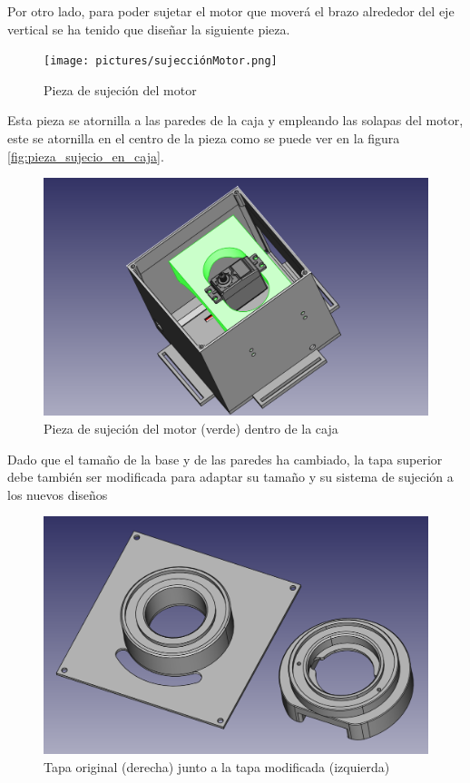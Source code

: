 Por otro lado, para poder sujetar el motor que moverá el brazo alrededor del eje vertical se ha tenido que diseñar la siguiente pieza.

 \begin{figure}[H]
    \centering
    \texttt{[image: pictures/sujecciónMotor.png]}
    \caption{Pieza de sujeción del motor}
    \label{fig:sujecion_motor}
\end{figure}

Esta pieza se atornilla a las paredes de la caja y empleando las solapas del motor, este se atornilla en el centro de la pieza como se puede ver en la figura \ref{fig:pieza_sujecio_en_caja}.

 \begin{figure}[H]
    \centering
    \includegraphics[width=.9\linewidth]{pictures/cajaConMotor.png}
    \caption{Pieza de sujeción del motor (verde) dentro de la caja}
    \label{fig:pieza_sujecio_en_caja_resaltada}
\end{figure}

Dado que el tamaño de la base y de las paredes ha cambiado, la tapa superior debe también ser modificada para adaptar su tamaño y su sistema de sujeción a los nuevos diseños

 \begin{figure}[H]
    \centering
    \includegraphics[width=.9\linewidth]{pictures/DosTapas.png}
    \caption{Tapa original (derecha) junto a la tapa modificada (izquierda)}
    \label{fig:tapas_caja}
\end{figure}

